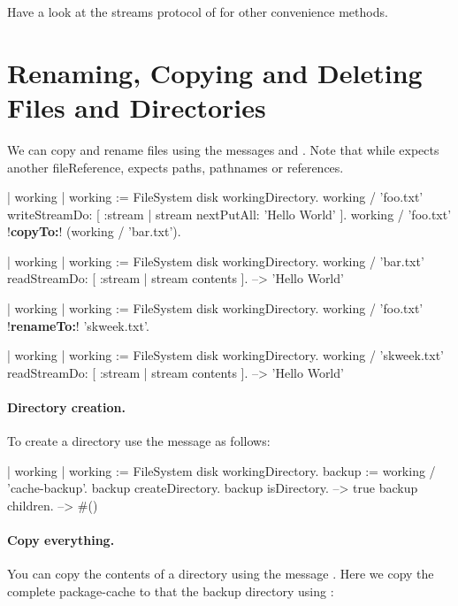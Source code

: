 \documentclass[a4paper,10pt,twoside]{book}
\begin{document}
Have a look at the streams protocol of  for other convenience methods.



\section{Renaming, Copying and Deleting Files and Directories}

We can copy and rename files using the messages  and \mbox{.} Note that while  expects another fileReference,   expects paths, pathnames or references.

\begin{code}{}
| working |
working := FileSystem disk workingDirectory.
working / 'foo.txt' writeStreamDo: [ :stream | stream nextPutAll: 'Hello World' ].
working / 'foo.txt' !\textbf{copyTo:}! (working / 'bar.txt').

| working  |
working := FileSystem disk workingDirectory.
working / 'bar.txt' readStreamDo: [ :stream | stream contents ].
-->  'Hello World'

| working |
working := FileSystem disk workingDirectory.
working / 'foo.txt' !\textbf{renameTo:}! 'skweek.txt'.

| working  |
working := FileSystem disk workingDirectory.
working / 'skweek.txt' readStreamDo: [ :stream | stream contents ]. 
-->  'Hello World'
\end{code} 


\paragraph{Directory creation.}
To create a directory use the message  as follows:

\begin{code}{}
| working  |
working := FileSystem disk workingDirectory.
backup := working / 'cache-backup'.
backup createDirectory.
backup isDirectory.
	--> true
backup children.
	--> #()
\end{code} 


\paragraph{Copy everything.}
You can  copy the contents of a directory using the message . Here we copy the complete package-cache to that the backup directory using :
\end{document}
